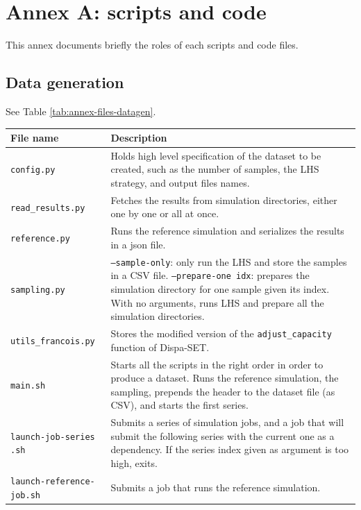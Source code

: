 \addtocounter{section}{1}
\section{Annex A: scripts and code}

This annex documents briefly the roles of each scripts and code files.

\subsection{Data generation}

See Table \ref{tab:annex-files-datagen}.

\begin{table}[h]
    \centering
    \begin{tabular}{|p{}|p{}|}
        \hline
        File name & Description \\ \hline
        \texttt{config.py} & Holds high level specification of the dataset to be created, such as the number of samples, the LHS strategy, and output files names. \\
        \texttt{read\_results.py} & Fetches the results from simulation directories, either one by one or all at once. \\
        \texttt{reference.py} & Runs the reference simulation and serializes the results in a json file. \\
        \texttt{sampling.py} & \texttt{--sample-only}: only run the LHS and store the samples in a CSV file. \texttt{--prepare-one idx}: prepares the simulation directory for one sample given its index. With no arguments, runs LHS and prepare all the simulation directories. \\
        \texttt{utils\_francois.py} & Stores the modified version of the \texttt{adjust\_capacity} function of Dispa-SET. \\ \hline
        \texttt{main.sh} & Starts all the scripts in the right order in order to produce a dataset. Runs the reference simulation, the sampling, prepends the header to the dataset file (as CSV), and starts the first series. \\
        \texttt{launch-job-series} \texttt{.sh} & Submits a series of simulation jobs, and a job that will submit the following series with the current one as a dependency. If the series index given as argument is too high, exits. \\
        \texttt{launch-reference-} \texttt{job.sh} & Submits a job that runs the reference simulation. \\

\end{tabular}
\end{table}
